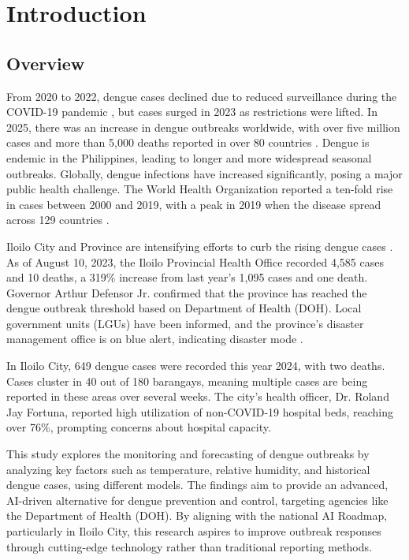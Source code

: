 \chapter{Introduction}
\label{sec:researchdesc}    %

\section{Overview}
\label{sec:overview}

From 2020 to 2022, dengue cases declined due to reduced surveillance during the COVID-19 pandemic \cite{WHO2023}, but cases surged in 2023 as restrictions were lifted. In 2025, there was an increase in dengue outbreaks worldwide, with over five million cases and more than 5,000 deaths reported in over 80 countries \cite{bosano2023who}.  Dengue is endemic in the Philippines, leading to longer and more widespread seasonal outbreaks. Globally, dengue infections have increased significantly, posing a major public health challenge. The World Health Organization reported a ten-fold rise in cases between 2000 and 2019, with a peak in 2019 when the disease spread across 129 countries \cite{WHO2024}.

Iloilo City and Province are intensifying efforts to curb the rising dengue cases \cite{PNA2024}. As of August 10, 2023, the Iloilo Provincial Health Office recorded 4,585 cases and 10 deaths, a 319\% increase from last year’s 1,095 cases and one death. Governor Arthur Defensor Jr. confirmed that the province has reached the dengue outbreak threshold based on Department of Health (DOH). Local government units (LGUs) have been informed, and the province's disaster management office is on blue alert, indicating disaster mode \cite{lena2024}. 

In Iloilo City, 649 dengue cases were recorded this year 2024, with two deaths. Cases cluster in 40 out of 180 barangays, meaning multiple cases are being reported in these areas over several weeks. The city’s health officer, Dr. Roland Jay Fortuna, reported high utilization of non-COVID-19 hospital beds, reaching over 76\%, prompting concerns about hospital capacity.  

This study explores the monitoring and forecasting of dengue outbreaks by analyzing key factors such as temperature, relative humidity, and historical dengue cases, using different models. The findings aim to provide an advanced, AI-driven alternative for dengue prevention and control, targeting agencies like the Department of Health (DOH). By aligning with the national AI Roadmap, particularly in Iloilo City, this research aspires to improve outbreak responses through cutting-edge technology rather than traditional reporting methods.

